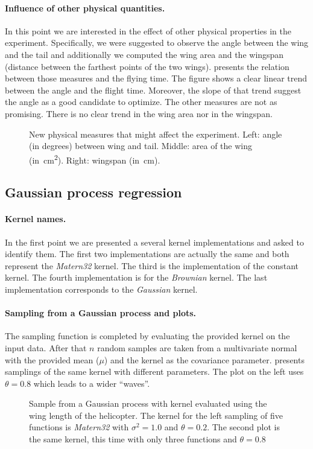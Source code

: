 \paragraph{Influence of other physical quantities.}
In this point we are interested in the effect of other physical properties in
the experiment. Specifically, we were suggested to observe the angle between the
wing and the tail and additionally we computed the wing area and the wingspan
(distance between the farthest points of the two wings). 
presents the relation between those measures and the flying time. The figure
shows a clear linear trend between the angle and the flight time. Moreover, the
slope of that trend suggest the angle as a good candidate to optimize. The other
measures are not as promising. There is no clear trend in the wing area nor in
the wingspan.

 \begin{figure}
  \centering
  
  \caption{New physical measures that might affect the experiment. Left: angle
  (in degrees) between wing and tail. Middle: area of the wing
  (in~\si{\centi\metre\squared}). Right: wingspan (in~\si{\centi\metre}). }
  \label{fig_newphysics}
\end{figure}

\subsection{Gaussian process regression}

\paragraph{Kernel names.} In the first point we are presented a several kernel
implementations and asked to identify them. The first two implementations are
actually the same and both represent the \emph{Matern32} kernel. The third is
the implementation of the constant kernel. The fourth implementation is for the
\emph{Brownian} kernel. The last implementation corresponds to the
\emph{Gaussian} kernel.

\paragraph{Sampling from a Gaussian process and plots.}
The sampling function is completed by evaluating the provided kernel on the
input data. After that $n$ random samples are taken from a multivariate normal
with the provided mean ($\mu$) and the kernel as the covariance parameter.
 presents samplings of the same kernel with different
parameters. The plot on the left uses $\theta=0.8$ which leads to a wider
``waves''.
\begin{figure}
  \centering
  
  \caption{Sample from a Gaussian process with kernel evaluated using the wing
  length of the helicopter. The kernel for the left sampling of five functions
  is \emph{Matern32} with $\sigma^2=1.0$ and $\theta=0.2$. The second plot is
  the same kernel, this time with only three functions and $\theta=0.8$}
  \label{fig_gpsamples}
\end{figure}

